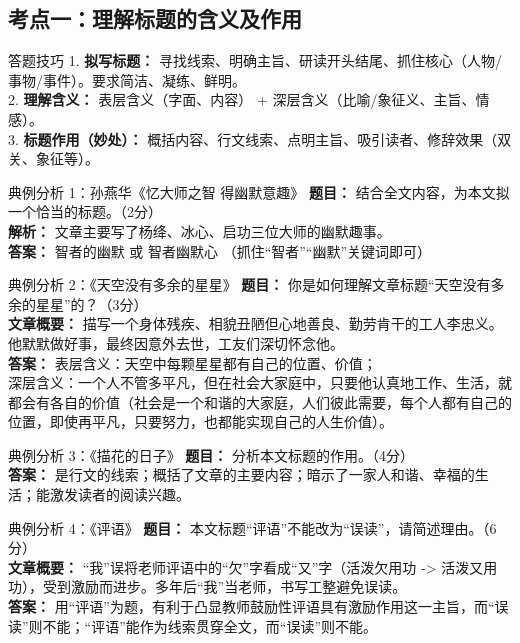 \documentclass[11pt, a4paper]{ctexart}
\begin{document}
\subsection{考点一：理解标题的含义及作用}

\begin{tipsbox}{答题技巧}
1. \textbf{拟写标题：} 寻找线索、明确主旨、研读开头结尾、抓住核心（人物/事物/事件）。要求简洁、凝练、鲜明。\\
2. \textbf{理解含义：} 表层含义（字面、内容） + 深层含义（比喻/象征义、主旨、情感）。\\
3. \textbf{标题作用（妙处）：} 概括内容、行文线索、点明主旨、吸引读者、修辞效果（双关、象征等）。
\end{tipsbox}

\begin{examplebox}{典例分析 1：孙燕华《忆大师之智 得幽默意趣》}
\textbf{题目：} 结合全文内容，为本文拟一个恰当的标题。（2分）\\
\textbf{解析：} 文章主要写了杨绛、冰心、启功三位大师的幽默趣事。\\
\textbf{答案：} 智者的幽默 或 智者幽默心 （抓住“智者”“幽默”关键词即可）
\end{examplebox}

\begin{examplebox}{典例分析 2：《天空没有多余的星星》}
\textbf{题目：} 你是如何理解文章标题“天空没有多余的星星”的？（3分）\\
\textbf{文章概要：} 描写一个身体残疾、相貌丑陋但心地善良、勤劳肯干的工人李忠义。他默默做好事，最终因意外去世，工友们深切怀念他。\\
\textbf{答案：} 表层含义：天空中每颗星星都有自己的位置、价值；\\
深层含义：一个人不管多平凡，但在社会大家庭中，只要他认真地工作、生活，就都会有各自的价值（社会是一个和谐的大家庭，人们彼此需要，每个人都有自己的位置，即使再平凡，只要努力，也都能实现自己的人生价值）。
\end{examplebox}

\begin{examplebox}{典例分析 3：《描花的日子》}
\textbf{题目：} 分析本文标题的作用。（4分）\\
\textbf{答案：} 是行文的线索；概括了文章的主要内容；暗示了一家人和谐、幸福的生活；能激发读者的阅读兴趣。
\end{examplebox}

\begin{examplebox}{典例分析 4：《评语》}
\textbf{题目：} 本文标题“评语”不能改为“误读”，请简述理由。（6分）\\
\textbf{文章概要：} “我”误将老师评语中的“欠”字看成“又”字（活泼欠用功 -> 活泼又用功），受到激励而进步。多年后“我”当老师，书写工整避免误读。\\
\textbf{答案：} 用“评语”为题，有利于凸显教师鼓励性评语具有激励作用这一主旨，而“误读”则不能；“评语”能作为线索贯穿全文，而“误读”则不能。
\end{examplebox}
\end{document}
